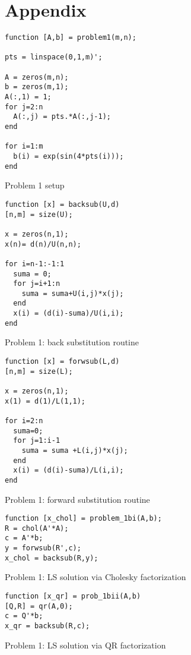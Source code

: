 \documentclass[10pt]{article}
\begin{document}
\section{Appendix}
\begin{program}
\begin{verbatim}
function [A,b] = problem1(m,n); 

pts = linspace(0,1,m)';

A = zeros(m,n);
b = zeros(m,1);
A(:,1) = 1;
for j=2:n
  A(:,j) = pts.*A(:,j-1);
end

for i=1:m
  b(i) = exp(sin(4*pts(i)));
end  
\end{verbatim}
  \caption{Problem 1 setup}
\end{program}

\begin{program}
\begin{verbatim}
function [x] = backsub(U,d)
[n,m] = size(U);

x = zeros(n,1);
x(n)= d(n)/U(n,n);

for i=n-1:-1:1
  suma = 0;
  for j=i+1:n
    suma = suma+U(i,j)*x(j);
  end
  x(i) = (d(i)-suma)/U(i,i);
end
\end{verbatim}
  \caption{Problem 1: back substitution routine}
\end{program}

\begin{program}
\begin{verbatim}
function [x] = forwsub(L,d)
[n,m] = size(L);

x = zeros(n,1);
x(1) = d(1)/L(1,1);

for i=2:n
  suma=0;
  for j=1:i-1
    suma = suma +L(i,j)*x(j);
  end
  x(i) = (d(i)-suma)/L(i,i);
end
\end{verbatim}
  \caption{Problem 1: forward substitution routine}
\end{program}

\begin{program}
\begin{verbatim}
function [x_chol] = problem_1bi(A,b);
R = chol(A'*A);
c = A'*b;
y = forwsub(R',c);
x_chol = backsub(R,y);
\end{verbatim}
  \caption{Problem 1: LS solution via Cholesky factorization}
\end{program}

\begin{program}
\begin{verbatim}
function [x_qr] = prob_1bii(A,b)
[Q,R] = qr(A,0); 
c = Q'*b;
x_qr = backsub(R,c);
\end{verbatim}
  \caption{Problem 1: LS solution via QR factorization}
\end{program}
\end{document}
